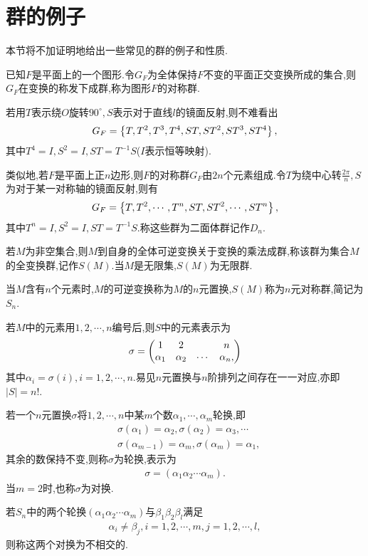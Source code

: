 \section{群的例子}
本节将不加证明地给出一些常见的群的例子和性质.
\begin{definition}\label{txfddiq}\label{emtq}
    已知$F$是平面上的一个图形.令$G_F$为全体保持$F$不变的平面正交变换所成的集合,则$G_F$在变换的称发下成群,称为图形$F$的对称群.

    若用$T$表示绕$O$旋转$90^\circ,S$表示对于直线$l$的镜面反射,则不难看出\begin{align*}
        G_F=\left\{T,T^2,T^3,T^4,ST,ST^2,ST^3,ST^4\right\},
    \end{align*}其中$T^4=I,S^2=I,ST=T^{-1}S$($I$表示恒等映射).
    
    类似地,若$F$是平面上正$n$边形,则$F$的对称群$G_F$由$2n$个元素组成.令$T$为绕中心转$\frac{2\pi}{n},S$为对于某一对称轴的镜面反射,则有\begin{align*}
        G_F=\left\{T,T^2,\cdots,T^n,ST,ST^2,\cdots,ST^n\right\},
    \end{align*}其中$T^n=I,S^2=I,ST=T^{-1}S$.称这些群为二面体群记作$D_n$.
\end{definition}
\begin{definition}\label{diqsn}\label{jhmdqbhq}\label{vh}\label{nydiq}\label{diq}\label{lh}\label{dh}
    若$M$为非空集合,则$M$到自身的全体可逆变换关于变换的乘法成群,称该群为集合$M$的全变换群,记作$S(M)$.当$M$是无限集,$S(M)$为无限群.

    当$M$含有$n$个元素时,$M$的可逆变换称为$M$的$n$元置换,$S(M)$称为$n$元对称群,简记为$S_n$.

    若$M$中的元素用$1,2,\cdots,n$编号后,则$S$中的元素表示为\begin{align*}
        \sigma=\left(\begin{matrix}
            1&2&&n\\
            \alpha_1&\alpha_2&\cdots&\alpha_n,
        \end{matrix}\right)
    \end{align*}其中$\alpha_i=\sigma(i),i=1,2,\cdots,n$.易见$n$元置换与$n$阶排列之间存在一一对应,亦即$|S|=n!$.

    若一个$n$元置换$\sigma$将$1,2,\cdots,n$中某$m$个数$\alpha_1,\cdots,\alpha_m$轮换,即\begin{align*}
        &\sigma(\alpha_1)=\alpha_2,\sigma(\alpha_2)=\alpha_3,\cdots\\
        &\sigma(\alpha_{m-1})=\alpha_m,\sigma(\alpha_m)=\alpha_1,
    \end{align*}其余的数保持不变,则称$\sigma$为轮换,表示为\begin{align*}
        \sigma=(\alpha_1\alpha_2\cdots\alpha_m).
    \end{align*}当$m=2$时,也称$\sigma$为对换.

    若$S_n$中的两个轮换$(\alpha_1\alpha_2\cdots\alpha_m)$与$\beta_1\beta_2\beta_l$满足\begin{align*}
        \alpha_i\neq\beta_j,i=1,2,\cdots,m,j=1,2,\cdots,l,
    \end{align*}则称这两个对换为不相交的.
\end{definition}

